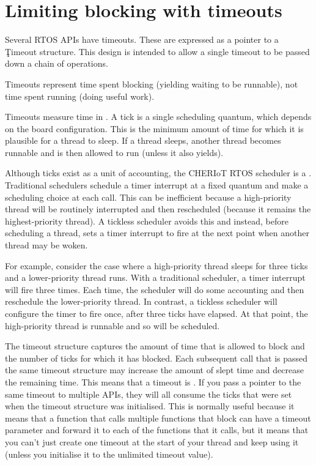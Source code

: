 \section[label=timeouts]{Limiting blocking with timeouts}

Several RTOS APIs have timeouts.
These are expressed as a pointer to a \c{Timeout} structure.
This design is intended to allow a single timeout to be passed down a chain of operations.

\begin{note}
Timeouts represent time spent blocking (yielding waiting to be runnable), not time spent running (doing useful work).
\end{note}

Timeouts measure time in .
A tick is a single scheduling quantum, which depends on the board configuration.
This is the minimum amount of time for which it is plausible for a thread to sleep.
If a thread sleeps, another thread becomes runnable and is then allowed to run (unless it also yields).

Although ticks exist as a unit of accounting, the CHERIoT RTOS scheduler is a .
Traditional schedulers schedule a timer interrupt at a fixed quantum and make a scheduling choice at each call.
This can be inefficient because a high-priority thread will be routinely interrupted and then rescheduled (because it remains the highest-priority thread).
A tickless scheduler avoids this and instead, before scheduling a thread, sets a timer interrupt to fire at the next point when another thread may be woken.

For example, consider the case where a high-priority thread sleeps for three ticks and a lower-priority thread runs.
With a traditional scheduler, a timer interrupt will fire three times.
Each time, the scheduler will do some accounting and then reschedule the lower-priority thread.
In contrast, a tickless scheduler will configure the timer to fire once, after three ticks have elapsed.
At that point, the high-priority thread is runnable and so will be scheduled.

The timeout structure captures the amount of time that is allowed to block and the number of ticks for which it has blocked.
Each subsequent call that is passed the same timeout structure may increase the amount of slept time and decrease the remaining time.
This means that a timeout is .
If you pass a pointer to the same timeout to multiple APIs, they will all consume the ticks that were set when the timeout structure was initialised.
This is normally useful because it means that a function that calls multiple functions that block can have a timeout parameter and forward it to each of the functions that it calls, but it means that you can't just create one timeout at the start of your thread and keep using it (unless you initialise it to the unlimited timeout value).

